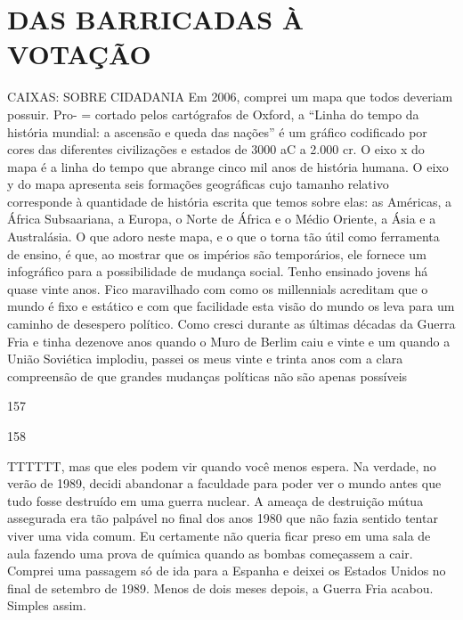 \chapter{DAS BARRICADAS À VOTAÇÃO}\label{DAS BARRICADAS À VOTAÇÃO}
 \par 
CAIXAS: SOBRE CIDADANIA Em 2006, comprei um mapa que todos deveriam possuir. Pro- = cortado pelos cartógrafos de Oxford, a “Linha do tempo da história mundial: a ascensão e queda das nações” é um gráfico codificado por cores das diferentes civilizações e estados de 3000 aC a {\color{blue}2}.{\color{blue}000} cr. O eixo x do mapa é a linha do tempo que abrange cinco mil anos de história humana. O eixo y do mapa apresenta seis formações geográficas cujo tamanho relativo corresponde à quantidade de história escrita que temos sobre elas: as Américas, a África Subsaariana, a Europa, o Norte de África e o Médio Oriente, a Ásia e a Australásia. O que adoro neste mapa, e o que o torna tão útil como ferramenta de ensino, é que, ao mostrar que os impérios são temporários, ele fornece um infográfico para a possibilidade de mudança social. Tenho ensinado jovens há quase vinte anos. Fico maravilhado com como os millennials acreditam que o mundo é fixo e estático e com que facilidade esta visão do mundo os leva para um caminho de desespero político. Como cresci durante as últimas décadas da Guerra Fria e tinha dezenove anos quando o Muro de Berlim caiu e vinte e um quando a União Soviética implodiu, passei os meus vinte e trinta anos com a clara compreensão de que grandes mudanças políticas não são apenas possíveis
 \par 
157
 \par 
158
 \par 
TTTTTT, mas que eles podem vir quando você menos espera. Na verdade, no verão de 1989, decidi abandonar a faculdade para poder ver o mundo antes que tudo fosse destruído em uma guerra nuclear. A ameaça de destruição mútua assegurada era tão palpável no final dos anos 1980 que não fazia sentido tentar viver uma vida comum. Eu certamente não queria ficar preso em uma sala de aula fazendo uma prova de química quando as bombas começassem a cair. Comprei uma passagem só de ida para a Espanha e deixei os Estados Unidos no final de setembro de 1989. Menos de dois meses depois, a Guerra Fria acabou. Simples assim.
 \par 
